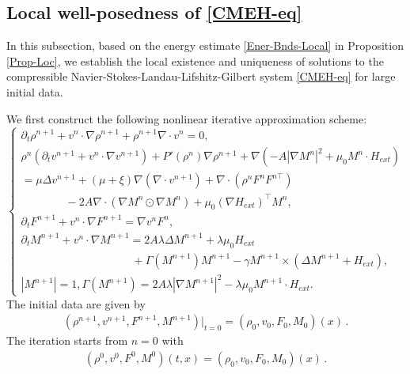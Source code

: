 \documentclass[reqno,11pt]{amsart}
\numberwithin{equation}{section}
\begin{document}
\subsection{Local well-posedness of \eqref{CMEH-eq}}

In this subsection, based on the energy estimate \eqref{Ener-Bnds-Local} in Proposition \ref{Prop-Loc}, we establish the local existence and uniqueness of solutions to the compressible Navier-Stokes-Landau-Lifshitz-Gilbert system \eqref{CMEH-eq} for large initial data.

We first construct the following nonlinear iterative approximation scheme:
\begin{equation}\label{Ite-App-Eq}
\begin{cases}
\partial_t \rho^{n+1} + v^{n} \cdot \nabla \rho^{n+1} + \rho^{n+1} \nabla \cdot v^{n}=0, \\[4pt]
\rho^{n}(\partial_t v^{n+1} + v^{n} \cdot \nabla v^{n+1} ) + P'( \rho^{n} ) \nabla \rho^{n+1} + \nabla ( - A | \nabla M^n |^{2} + \mu_{0} M^{n} \cdot H_{ext} ) \\
=\mu \Delta v^{n+1} + ( \mu + \xi ) \nabla ( \nabla \cdot v^{n+1} ) + \nabla \cdot ( \rho^{n} F^{n} F^{n \top} ) \\
\qquad \qquad -2 A \nabla \cdot ( \nabla M^{n} \odot \nabla M^{n} ) + \mu_{0} ( \nabla H_{ext} )^\top M^{n}, \\[4pt]
\partial_t F^{n+1} + v^{n} \cdot \nabla F^{n+1} = \nabla v^{n} F^{n}, \\[4pt]
\partial_t M^{n+1} + v^{n} \cdot \nabla M^{n+1} = 2 A \lambda \Delta M^{n+1} + \lambda \mu_{0} H_{ext} \\
\qquad \qquad \qquad \qquad \qquad + \Gamma ( M^{n+1} ) M^{n+1} - \gamma M^{n+1} \times ( \Delta M^{n+1} + H_{ext} ) , \\[4pt]
\left| M^{n+1} \right|=1, \Gamma ( M^{n+1} ) = 2 A \lambda | \nabla M^{n+1}|^2 - \lambda \mu_{0} M^{n+1} \cdot H_{ext} .
\end{cases} 
\end{equation}
The initial data are given by
\begin{equation*}
    \begin{aligned}
        ( \rho^{n+1}, v^{n+1}, F^{n+1}, M^{n+1} ) |_{t=0} = ( \rho_0, v_0, F_0, M_0 ) (x) \,.
    \end{aligned}
\end{equation*}
The iteration starts from $n = 0$ with
\begin{equation*}
    \begin{aligned}
        ( \rho^0, v^0, F^0, M^0 ) (t,x) = ( \rho_0, v_0, F_0, M_0 ) (x) \,.
    \end{aligned}
\end{equation*}
\end{document}
